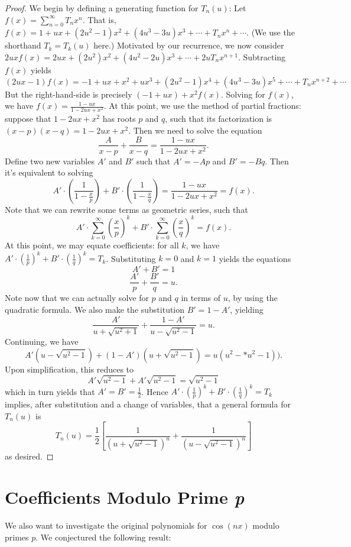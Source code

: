 \documentclass[12pt, letterpaper]{article} %
\begin{document}
\begin{proof}
We begin by defining a generating function for $T_{n}(u)$: Let $f(x) = \displaystyle \sum_{n=0}^{\infty} T_{n}x^{n}$. That is, $f(x) = 1 + ux + (2u^2-1)x^2 + (4u^3-3u)x^3 + \cdots + T_{n}x^{n}+\cdots$. (We use the shorthand $T_k = T_k(u)$ here.)
Motivated by our recurrence, we now consider $2uxf(x) = 2ux + (2u^2)x^2 + (4u^2-2u)x^3 + \cdots + 2uT_{n}x^{n+1}$. Subtracting $f(x)$ yields
$$(2ux-1)f(x) = -1 + ux + x^{2} + ux^{3} +(2u^{2}-1)x^{4} + (4u^{3}-3u)x^{5} + \cdots + T_{n}x^{n+2}+\cdots$$
But the right-hand-side is precisely $(-1 + ux) + x^{2}f(x)$. Solving for $f(x)$, we have $f(x) = \frac{1-ux}{1-2ux+x^2}$.
At this point, we use the method of partial fractions: suppose that $1 - 2ux + x^2$ has roots $p$ and $q$, such that its factorization is $(x-p)(x-q) = 1 - 2ux + x^2$. Then we need to solve the equation
$$\dfrac{A}{x-p} + \dfrac{B}{x-q} = \dfrac{1 - ux}{1 - 2ux + x^2}.$$
Define two new variables $A'$ and $B'$ such that $A' = -Ap$ and $B' = -Bq$. Then it's equivalent to solving
$$A'\cdot \left( \dfrac{1}{1 - \frac{x}{p}} \right)+ B' \cdot \left( \dfrac{1}{1- \frac{x}{q}} \right) = \dfrac{1 - ux}{1 - 2ux + x^2} = f(x).$$
Note that we can rewrite some terms as geometric series, such that
$$A' \cdot \displaystyle\sum_{k=0}^{\infty} \left(\frac{x}{p}\right)^k + B' \cdot \displaystyle\sum_{k=0}^{\infty} \left(\frac{x}{q}\right)^k = f(x).$$
At this point, we may equate coefficients: for all $k$, we have $A' \cdot \left( \frac{1}{p} \right)^k + B' \cdot \left( \frac{1}{q} \right)^k = T_k$. Substituting $k = 0$ and $k = 1$ yields the equations
$$A' + B' = 1$$
$$\frac{A'}{p} + \frac{B'}{q} = u.$$
Note now that we can actually solve for $p$ and $q$ in terms of $u$, by using the quadratic formula. We also make the substitution $B' = 1 - A'$, yielding
$$\frac{A'}{u + \sqrt{u^2 + 1}} + \frac{1 - A'}{u - \sqrt{u^2 - 1}} = u.$$
Continuing, we have
$$A'(u - \sqrt{u^2 - 1}) + (1-A')(u + \sqrt{u^2 - 1}) = u(u^2 - *u^2 - 1)).$$
Upon simplification, this reduces to
$$A' \sqrt{u^2 - 1} + A' \sqrt{u^2 - 1} = \sqrt{u^2 - 1}$$
which in turn yields that $A' = B' = \frac{1}{2}$.
Hence $A' \cdot \left( \frac{1}{p} \right)^k + B' \cdot \left( \frac{1}{q} \right)^k = T_k$ implies, after substitution and a change of variables, that a general formula for $T_n(u)$ is
$$T_{n}(u) = \frac{1}{2} \left[ \frac{1}{(u+\sqrt{u^{2}-1})^{n}} + \frac{1}{(u-\sqrt{u^{2}-1})^{n}} \right]$$
as desired.
\end{proof}

\section{Coefficients Modulo Prime \emph{p}}
We also want to investigate the original polynomials for $\cos(nx)$ modulo primes $p$. We conjectured the following result:
\end{document}
